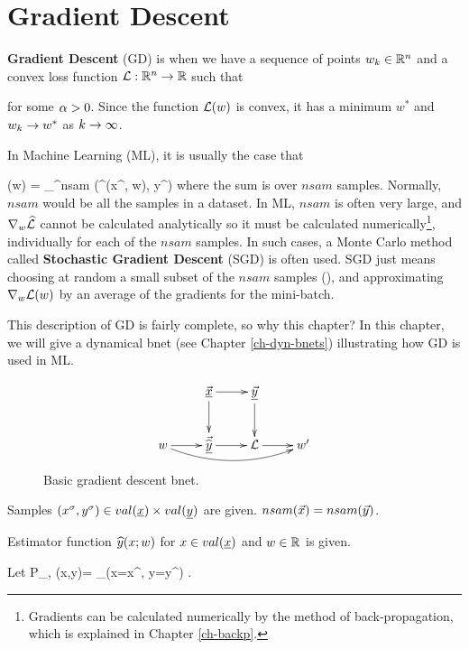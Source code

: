 \chapter{Gradient Descent}
\label{ch-gradient-descent}


{\bf Gradient Descent} (GD) is when we have a sequence of points $w_k\in{ \mathbb{R}}^n$ and a convex loss function ${\cal L}:{ \mathbb{R}}^n\rightarrow { \mathbb{R}}$ such that

\beq
{}
\label{eq-grad-descent}
\eeq
for some  $\alpha>0$.
Since the function ${\cal L}(w)$ is convex, 
it has a minimum $w^*$ and $w_k\rightarrow w^*$
as $k\rightarrow \infty$.

In Machine Learning (ML), it
is usually the case that

\beq
\call(w) = \sum_{}^{nsam}
\HAT{\call}(\haty^\s(x^\s, w), y^\s)
\eeq
where the sum is over $nsam$ samples. Normally, $nsam$ would be 
all the samples in a dataset.
In ML, $nsam$ is often very large, 
and $\nabla_w{\widehat{{\cal L}}} $ cannot
be calculated analytically so it must be calculated numerically\footnote{Gradients can 
be calculated numerically 
by the method of
back-propagation, which is explained in Chapter \ref{ch-backp}.},
individually for each of the $nsam$ samples. In such cases,
a Monte Carlo method called {\bf Stochastic Gradient Descent} (SGD)
is often used. 
SGD just means choosing at random
a small subset of the $nsam$ samples (), and
approximating $\nabla_w{\cal L}(w)$ by
an average of the gradients for the mini-batch.

This description of GD is fairly complete, so why this chapter? In this chapter, we will 
give a dynamical bnet (see Chapter \ref{ch-dyn-bnets}) illustrating how GD is used in ML.

\begin{figure}[h!]
\centering
$$\xymatrix{
&\vec{\rvx}\ar[d]\ar[r]&\ul{\vecy}
\ar[d]&\\
w\ar[r]\ar@/_1pc/[rrr]&
\vec{\HAT{\rvy}}\ar[r]&\call\ar[r]&w'
}$$
\caption{Basic gradient descent bnet.}
\label{fig-bfit}
\end{figure}


Samples 
$(x^\s, y^\s)\in val(\rvx)\times val(\rvy)$
are given. $nsam({\vec{x}})=nsam({\vec{y}})$.

Estimator function 
${\widehat{y}}(x; w)$
for $x\in val(\rvx)$ and $w\in{ \mathbb{R}}$
is given.

Let 
\beq
P_{\rvx, \rvy}(x,y)=
\sum_\s \indi(x=x^\s, y=y^\s)
\;.
\eeq


